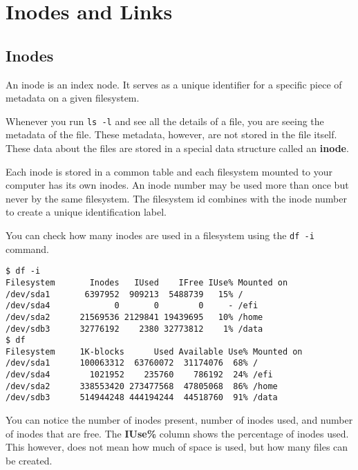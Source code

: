 
\vfill
\pagebreak
\section{Inodes and Links}

\subsection{Inodes}

\begin{definition}[Inodes]
  An inode is an index node.
  It serves as a unique identifier for a specific piece of metadata on a given filesystem.
\end{definition}

Whenever you run \lstinline|ls -l| and see all the details of a file, you are seeing the metadata of the file.
These metadata, however, are not stored in the file itself.
These data about the files are stored in a special data structure called an \textbf{inode}.

Each inode is stored in a common table and each filesystem mounted to your computer has its own inodes.
An inode number may be used more than once but never by the same filesystem.
The filesystem id combines with the inode number to create a unique identification label.

You can check how many inodes are used in a filesystem using the \lstinline|df -i| command.

\begin{lstlisting}
$ df -i
Filesystem       Inodes   IUsed    IFree IUse% Mounted on
/dev/sda1       6397952  909213  5488739   15% /
/dev/sda4             0       0        0     - /efi
/dev/sda2      21569536 2129841 19439695   10% /home
/dev/sdb3      32776192    2380 32773812    1% /data
$ df
Filesystem     1K-blocks      Used Available Use% Mounted on
/dev/sda1      100063312  63760072  31174076  68% /
/dev/sda4        1021952    235760    786192  24% /efi
/dev/sda2      338553420 273477568  47805068  86% /home
/dev/sdb3      514944248 444194244  44518760  91% /data
\end{lstlisting}

You can notice the number of inodes present, number of inodes used, and number of inodes that are free.
The \textbf{IUse\%} column shows the percentage of inodes used.
This however, does not mean how much of space is used, but how many files can be created.

